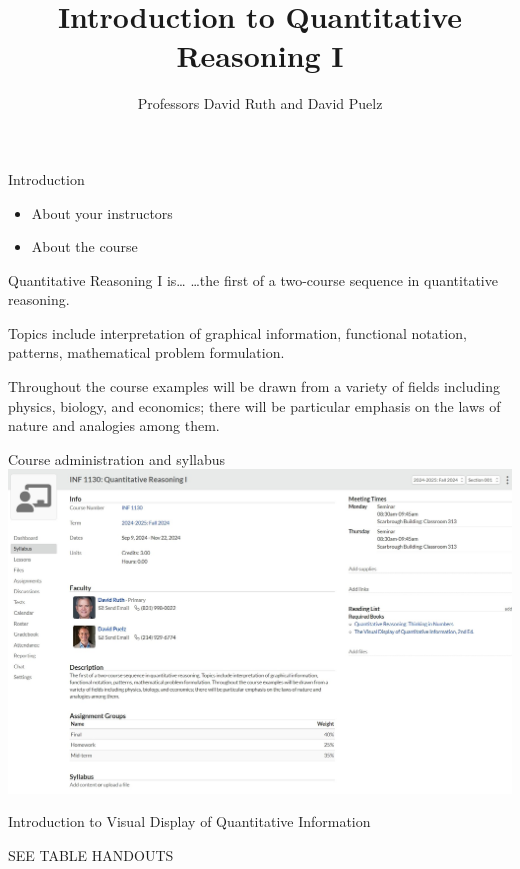 \documentclass[
  ignorenonframetext,
]{beamer}
\title{Introduction to Quantitative Reasoning I}
\author{Professors David Ruth and David Puelz}
\date{}
\institute{The University of Austin}
\providecommand{\tightlist}{%
  \setlength{\itemsep}{0pt}\setlength{\parskip}{0pt}}
\begin{document}
\frame{\titlepage}

\begin{frame}{Introduction}
\protect\hypertarget{introduction}{}
\begin{itemize}
\tightlist
\item
  About your instructors
\item
  About the course
\end{itemize}
\end{frame}

\begin{frame}{Quantitative Reasoning I is\ldots{}}
\protect\hypertarget{quantitative-reasoning-i-is}{}
\ldots the first of a two-course sequence in quantitative reasoning.

Topics include interpretation of graphical information, functional
notation, patterns, mathematical problem formulation.

Throughout the course examples will be drawn from a variety of fields
including physics, biology, and economics; there will be particular
emphasis on the laws of nature and analogies among them.
\end{frame}

\begin{frame}{Course administration and syllabus}
\protect\hypertarget{course-administration-and-syllabus}{}
\includegraphics{"intro_figs/Populi1.jpeg"}
\end{frame}

\begin{frame}{Introduction to Visual Display of Quantitative
Information}
\protect\hypertarget{introduction-to-visual-display-of-quantitative-information}{}
\begingroup
{}\fontsize{16}{18}\selectfont
\begin{center}
  SEE TABLE HANDOUTS
\end{center}
\endgroup
\end{frame}
\end{document}
